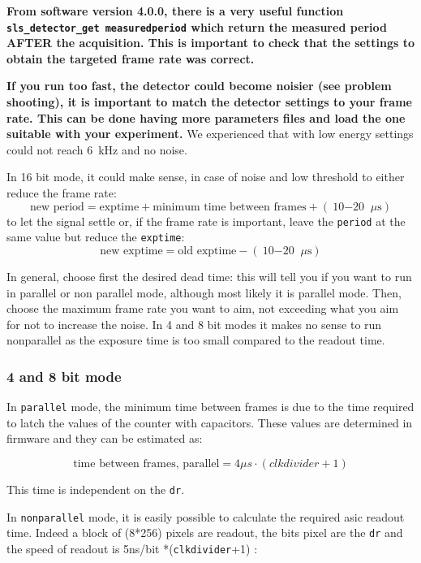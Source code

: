 \documentclass{article}
\begin{document}
\textbf{From software version 4.0.0, there is a very useful function {\tt{sls\_detector\_get measuredperiod}} which return the measured period AFTER the acquisition. This is important to check that the settings to obtain the targeted frame rate was correct.} 

\textbf{If you run too fast, the detector could become noisier (see problem shooting), it is important to match the detector settings to your frame rate. This can be done having more parameters files and load the one suitable with your experiment.} We experienced that with low energy settings could not reach 6~kHz and no noise.

In 16 bit mode, it could make sense, in case of noise and low threshold to either reduce the frame rate:
\begin{equation} 
\textrm{new period}  = \textrm{exptime} + \textrm{minimum time between frames} + (\textrm{10$-$20 }\mu \textrm{s})
\end{equation}
to let the signal settle  or,  if the frame rate is important, leave the {\tt{period}} at the same value but reduce the {\tt{exptime}}:
\begin{equation} 
\textrm{new exptime}  = \textrm{old exptime} - (\textrm{10$-$20 }\mu \textrm{s})
\end{equation}

In general, choose first the desired dead time: this will tell you if you want to run in parallel or non parallel mode, although most likely it is parallel mode. Then, choose the maximum frame rate you want to aim, not exceeding what you aim for not to increase the noise. In 4 and 8 bit modes it makes no sense to run nonparallel as the exposure time is too small compared to the readout time. 

\subsubsection{4 and 8 bit mode}
In {\tt{parallel}} mode, the minimum time between frames is due to the time required to latch the values of the counter with capacitors. These values are determined in firmware and they can be estimated as:

\begin{equation} \label{dtparallel}
\textrm{time between frames, parallel} = 4 \mu s \cdot (clkdivider+1)
\end{equation}

This time is independent on the {\tt{dr}}.

In {\tt{nonparallel}} mode, it is easily possible to calculate the required asic readout time. 
Indeed a block of (8*256) pixels are readout, the bits pixel are the {\tt{dr}} and the speed of readout is 5ns/bit *({\tt{clkdivider}}+1) : 
\end{document}
